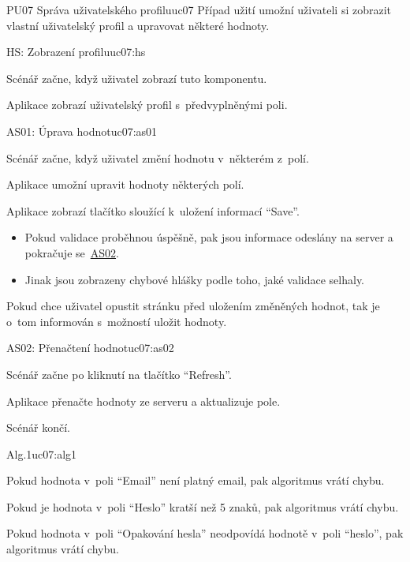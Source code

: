 \begin{usecase}{PU07 Správa uživatelského profilu}{uc07}
    Případ užití umožní uživateli si zobrazit vlastní uživatelský profil a upravovat některé hodnoty.

    \begin{scenario}{HS: Zobrazení profilu}{uc07:hs}
        \item Scénář začne, když uživatel zobrazí tuto komponentu.
        \item Aplikace zobrazí uživatelský profil s~předvyplněnými poli.
    \end{scenario}

    \begin{scenario}{AS01: Úprava hodnot}{uc07:as01}
        \item Scénář začne, když uživatel změní hodnotu v~některém z~polí.
        \item Aplikace umožní upravit hodnoty některých polí.
        \item Aplikace zobrazí tlačítko sloužící k~uložení informací \enquote{Save}.
        \item {}
        \begin{itemize}
            \item Pokud validace proběhnou úspěšně, pak jsou informace odeslány na server a pokračuje se~\hyperref[uc07:as02]{AS02}.
            \item Jinak jsou zobrazeny chybové hlášky podle toho, jaké validace selhaly.
        \end{itemize}
        \item Pokud chce uživatel opustit stránku před uložením změněných hodnot, tak je o~tom informován s~možností uložit hodnoty.
    \end{scenario}

    \begin{scenario}{AS02: Přenačtení hodnot}{uc07:as02}
        \item Scénář začne po kliknutí na tlačítko \enquote{Refresh}.
        \item Aplikace přenačte hodnoty ze serveru a aktualizuje pole.
        \item Scénář končí.
    \end{scenario}

    \begin{scenario}{Alg.1}{uc07:alg1}
        \item Pokud hodnota v~poli \enquote{Email} není platný email, pak algoritmus vrátí chybu.
        \item Pokud je hodnota v~poli \enquote{Heslo} kratší než 5 znaků, pak algoritmus vrátí chybu.
        \item Pokud hodnota v~poli \enquote{Opakování hesla} neodpovídá hodnotě v~poli \enquote{heslo}, pak algoritmus vrátí chybu.
    \end{scenario}
\end{usecase}